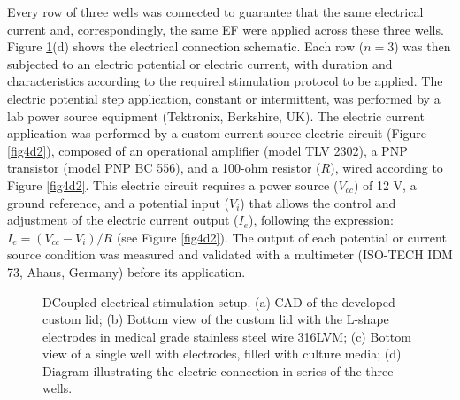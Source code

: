 Every row of three wells was connected to guarantee that the same electrical current and, correspondingly, the same \acs{EF} were applied across these three wells. Figure \ref{fig4d1}(d) shows the electrical connection schematic. Each row ($n=3$) was then subjected to an electric potential or electric current, with duration and characteristics according to the required stimulation protocol to be applied. The electric potential step application, constant or intermittent, was performed by a lab power source equipment (Tektronix, Berkshire, UK). The electric current application was performed by a custom current source electric circuit (Figure \ref{fig4d2}), composed of an operational amplifier (model TLV 2302), a PNP transistor (model PNP BC 556), and a 100-ohm resistor ($R$), wired according to Figure \ref{fig4d2}. This electric circuit requires a power source ($V_{cc}$) of 12 \si{\volt}, a ground reference, and a potential input ($V_i$) that allows the control and adjustment of the electric current output ($I_e$), following the expression: $I_e=(V_{cc}-V_i)/R$ (see Figure \ref{fig4d2}). The output of each potential or current source condition was measured and validated with a multimeter (ISO-TECH IDM 73, Ahaus, Germany) before its application. 

\begin{figure}
\caption{\acs{DCoupled} electrical stimulation setup. (a) CAD of the developed custom lid; (b) Bottom view of the custom lid with the L-shape electrodes in medical grade stainless steel wire 316LVM; (c) Bottom view of a single well with electrodes, filled with culture media; (d) Diagram illustrating the electric connection in series of the three wells.}
\label{fig4d1}
\end{figure} 

